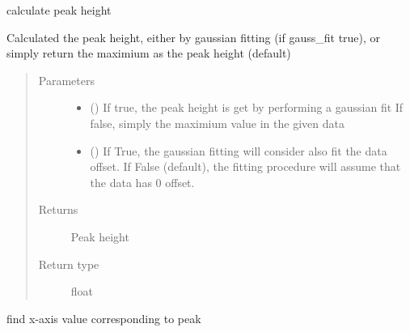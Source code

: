 \documentclass[letterpaper,10pt,english]{sphinxmanual}
\begin{document}
\begin{fulllineitems}
\begin{fulllineitems}
\begin{quote}
\begin{description}
\begin{itemize}
\end{itemize}


\end{description}\end{quote}

\end{fulllineitems}


\begin{fulllineitems}
\label{\detokenize{scibeam.core:scibeam.core.peak.SeriesPeak.height}}
calculate peak height

Calculated the peak height, either by gaussian fitting (if gauss\_fit
true), or simply return the maximium as the peak height (default)
\begin{quote}\begin{description}
\item[{Parameters}] \leavevmode\begin{itemize}
\item {} 
 () \textendash{} If true, the peak height is get by performing a gaussian fit
If false, simply the maximium value in the given data

\item {} 
 () \textendash{} If True, the gaussian fitting will consider also fit the data
offset. If False (default), the fitting procedure will assume that
the data has 0 offset.

\end{itemize}

\item[{Returns}] \leavevmode
Peak height

\item[{Return type}] \leavevmode
float

\end{description}\end{quote}

\end{fulllineitems}


\begin{fulllineitems}
\label{\detokenize{scibeam.core:scibeam.core.peak.SeriesPeak.idx}}
find x-axis value corresponding to peak


\end{fulllineitems}
\end{fulllineitems}
\end{document}

